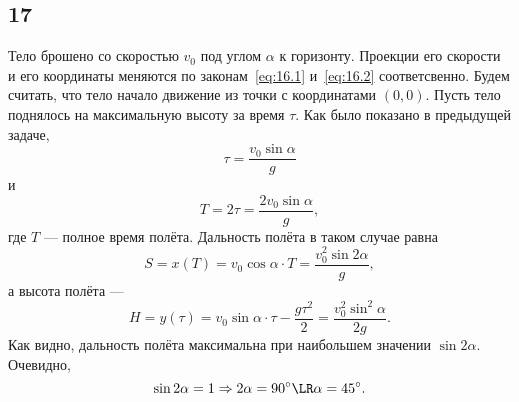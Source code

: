 \subsection{17}

Тело брошено со скоростью $v_0$ под углом $\alpha$ к горизонту. Проекции его скорости и его координаты меняются по законам~\eqref{eq:16.1} и~\eqref{eq:16.2} соответсвенно. Будем считать, что тело начало движение из точки с координатами $(0,0)$. Пусть тело поднялось на максимальную высоту за время $\tau$. Как было показано в предыдущей задаче,
\[
\tau=\frac{v_0\sin\alpha}{g}
\]
и
\[
T=2\tau=\frac{2v_0\sin\alpha}{g},
\]
где $T$ --- полное время полёта. Дальность полёта в таком случае равна
\[
S=x(T)=v_0\cos\alpha\cdot T=\frac{v_0^2\sin2\alpha}{g},
\]
а высота полёта ---
\[
H=y(\tau)=v_0\sin\alpha\cdot\tau-\frac{g\tau^2}{2}=\frac{v_0^2\sin^2\alpha}{2g}.
\]
Как видно, дальность полёта максимальна при наибольшем значении $\sin2\alpha$. Очевидно,
\[
\sin2\alpha=1\Rightarrow2\alpha=90^\circ\LR\alpha=45^\circ.
\]
